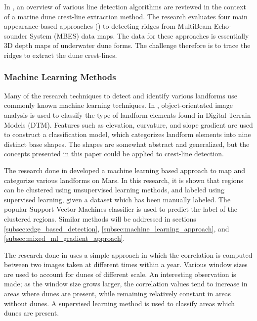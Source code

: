 In \cite{2016_comparisons_crest_line_extraction_marine_dunes}, an overview of various line detection algorithms are reviewed in the context of a marine dune crest-line extraction method. The research evaluates four main appearance-based approaches (\cite{2005_topology_driven_algorithms_for_ridge_extraction,2005_smooth_feature_lines_surface_meshes,2004_ridge_valley_lines_meshes_surface_fitting}) to detecting ridges from MultiBeam Echo-sounder System (MBES) data maps. The data for these approaches is essentially 3D depth maps of underwater dune forms. The challenge therefore is to trace the ridges to extract the dune crest-lines.

\subsubsection{Machine Learning Methods}
Many of the research techniques to detect and identify various landforms use commonly known machine learning techniques. In \cite{2006_automated_classification_landform_elements}, object-orientated image analysis is used to classify the type of landform elements found in Digital Terrain Models (DTM). Features such as elevation, curvature, and slope gradient are used to construct a classification model, which categorizes landform elements into nine distinct base shapes. The shapes are somewhat abstract and generalized, but the concepts presented in this paper could be applied to crest-line detection.

The research done in \cite{2007_Machine_Learning_tools_automatic_mapping_mars} developed a machine learning based approach to map and categorize various landforms on Mars. In this research, it is shown that regions can be clustered using unsupervised learning methods, and labeled using supervised learning, given a dataset which has been manually labeled. The popular Support Vector Machines classifier is used to predict the label of the clustered regions. Similar methods will be addressed in sections \ref{subsec:edge_based_detection}, \ref{subsec:machine_learning_approach}, and \ref{subsec:mixed_ml_gradient_approach}.

The research done in \cite{2013_sar_image_automated_detection_dune_area} uses a simple approach in which the correlation is computed between two images taken at different times within a year. Various window sizes are used to account for dunes of different scale. An interesting observation is made; as the window size grows larger, the correlation values tend to increase in areas where dunes are present, while remaining relatively constant in areas without dunes. A supervised learning method is used to classify areas which dunes are present.


